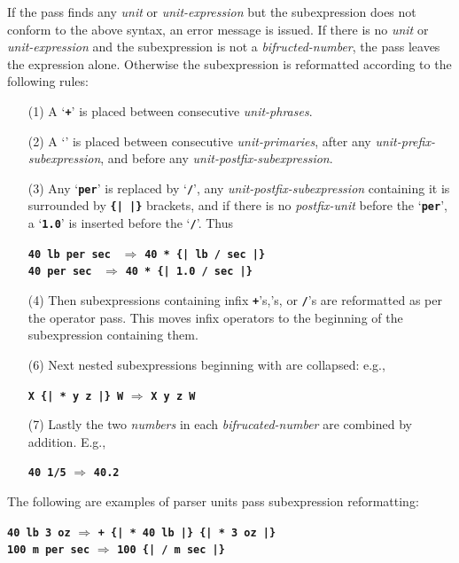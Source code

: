 \documentclass[12pt]{article}
\newcommand{\TT}[1]{{\tt \bfseries #1}}
\begin{document}
If the pass finds any {\em unit} or {\em unit-expression} but
the subexpression does not conform to the above syntax, an error
message is issued.  If there is no {\em unit} or {\em unit-expression}
and the subexpression is not a {\em bifructed-number}, the
pass leaves the expression alone.  Otherwise the subexpression is reformatted
according to the following rules:
\begin{itemize}
\item[(1)] A `\TT{+}' is placed between consecutive {\em unit-phrases}.
\item[(2)] A `\TT{*}' is placed between consecutive {\em unit-primaries},
after any {\em unit-prefix-subexpression}, and before any
{\em unit-postfix-subexpression}.
\item[(3)] Any `\TT{per}' is replaced by `\TT{/}', any
{\em unit-postfix-subexpression} containing it is surrounded by
\TT{\{|~|\}} brackets, and if there is no {\em postfix-unit} before
the `\TT{per}', a `\TT{1.0}' is inserted before the `\TT{/}'. Thus
\begin{center}
\TT{40 lb per sec } $\Longrightarrow$ \TT{40 * \{| lb / sec |\}} \\
\TT{40 per sec } $\Longrightarrow$ \TT{40 * \{| 1.0 / sec |\}}
\end{center}
\item[(4)] Then subexpressions containing infix \TT{+}'s,\TT{*}'s, or
\TT{/}'s are
reformatted as per the operator pass.  This moves infix operators
to the beginning of the subexpression containing them.
\item[(6)] Next nested subexpressions beginning with \TT{*} are
collapsed: e.g.,
\begin{center}
\TT{* X \{|~* y z |\} W} $\Longrightarrow$ \TT{* X y z W}
\end{center}
\item[(7)] Lastly the two {\em numbers} in each {\em bifrucated-number}
are combined by addition.  E.g.,
\begin{center}
\TT{40 1/5} $\Longrightarrow$ \TT{40.2}
\end{center}
\end{itemize}

The following are examples of parser units pass subexpression reformatting:
\begin{center}
\TT{40 lb 3 oz} $\Longrightarrow$ \TT{+ \{| * 40 lb |\} \{| * 3 oz |\}}
\\
\TT{100 m per sec} $\Longrightarrow$ \TT{* 100 \{| / m sec |\}}
\end{center}
\end{document}
